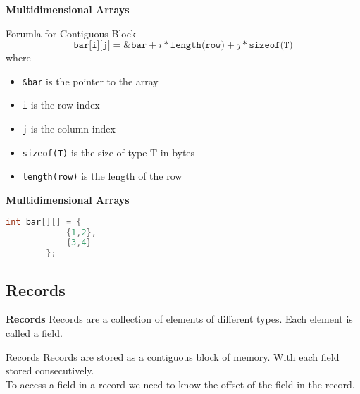 \begin{frame}{\textbf{Multidimensional Arrays}}
    \begin{block}{Forumla for Contiguous Block}
        \begin{equation*}
            \texttt{bar[i][j]} = \texttt{\&bar} + i * \texttt{length(row)} + j * \texttt{sizeof(T)}
        \end{equation*}
        where 
        \begin{itemize}
            \item \texttt{\&bar} is the pointer to the array
            \item \texttt{i} is the row index
            \item \texttt{j} is the column index
            \item \texttt{sizeof(T)} is the size of type T in bytes
            \item \texttt{length(row)} is the length of the row
        \end{itemize}
    \end{block}
\end{frame}

\begin{frame}[fragile]{\textbf{Multidimensional Arrays}}
    \begin{example}
        \begin{lstlisting}[language=c]
    int bar[][] = {
            {1,2},
            {3,4}
        };
        \end{lstlisting}
    \end{example}
\end{frame}

\subsection{Records}
\begin{frame}{\textbf{Records}}
    Records are a collection of elements of different types.
    Each element is called a field.\\
    \begin{block}{Records}
        Records are stored as a contiguous block of memory. With each field stored consecutively.\\
        To access a field in a record we need to know the offset of the field in the record.
    \end{block}
\end{frame}

